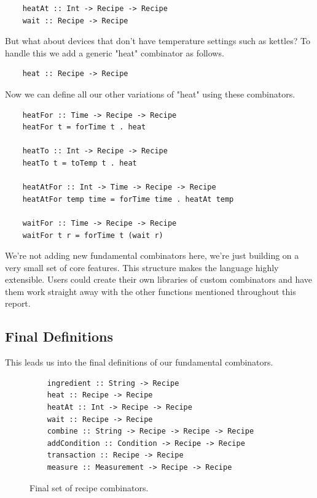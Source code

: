 \documentclass[11pt]{article}
\begin{document}
\begin{lstlisting}
    heatAt :: Int -> Recipe -> Recipe
    wait :: Recipe -> Recipe
\end{lstlisting}

But what about devices that don't have temperature settings such as kettles? To handle
this we add a generic "heat" combinator as follows.

\begin{lstlisting}
    heat :: Recipe -> Recipe
\end{lstlisting}

Now we can define all our other variations of "heat" using these combinators.

\begin{lstlisting}
    heatFor :: Time -> Recipe -> Recipe
    heatFor t = forTime t . heat

    heatTo :: Int -> Recipe -> Recipe
    heatTo t = toTemp t . heat

    heatAtFor :: Int -> Time -> Recipe -> Recipe
    heatAtFor temp time = forTime time . heatAt temp

    waitFor :: Time -> Recipe -> Recipe
    waitFor t r = forTime t (wait r)
\end{lstlisting}

We're not adding new fundamental combinators here, we're just building on a very small
set of core features. This structure makes the language highly extensible. Users could
create their own libraries of custom combinators and have them work straight away with
the other functions mentioned throughout this report.

\subsection{Final Definitions}

This leads us into the final definitions of our fundamental combinators.

\begin{figure}[h]
\begin{lstlisting}
    ingredient :: String -> Recipe
    heat :: Recipe -> Recipe
    heatAt :: Int -> Recipe -> Recipe
    wait :: Recipe -> Recipe
    combine :: String -> Recipe -> Recipe -> Recipe
    addCondition :: Condition -> Recipe -> Recipe
    transaction :: Recipe -> Recipe
    measure :: Measurement -> Recipe -> Recipe
\end{lstlisting}
\caption{Final set of recipe combinators.}
\end{figure}
\end{document}
